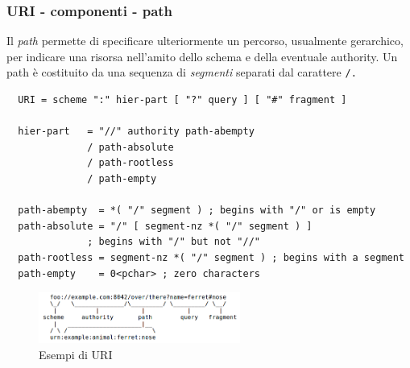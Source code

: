 \documentclass[8pt]{beamer}
\begin{document}
\begin{frame}[fragile]
	\frametitle{URI - componenti - path}
	
	Il \emph{path} permette di specificare ulteriormente un percorso,
	usualmente gerarchico, per indicare una risorsa nell'amito dello
	schema e della eventuale authority. Un path \`e costituito da una
	sequenza di  \emph{segmenti} separati dal carattere \tt{/}.
	
	\begin{verbatim}
  URI = scheme ":" hier-part [ "?" query ] [ "#" fragment ]

  hier-part   = "//" authority path-abempty
              / path-absolute
              / path-rootless
              / path-empty                  

  path-abempty  = *( "/" segment ) ; begins with "/" or is empty
  path-absolute = "/" [ segment-nz *( "/" segment ) ] 
              ; begins with "/" but not "//"
  path-rootless = segment-nz *( "/" segment ) ; begins with a segment
  path-empty    = 0<pchar> ; zero characters
	\end{verbatim}
	
	\vspace{\baselineskip}
	
	\begin{figure}
	    \includegraphics[width=250px]{imgs/uri-pieces.png}
	    \caption{Esempi di URI}
	\end{figure}
	
\end{frame}




\end{document}
